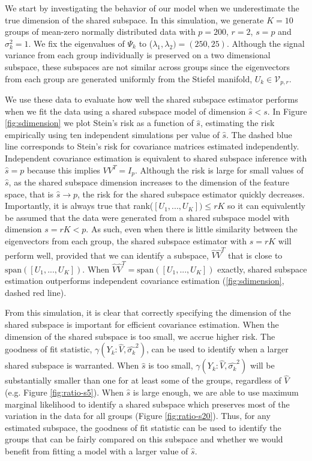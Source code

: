 \documentclass[12pt]{article}
\begin{document}
We start by investigating the behavior of our model when we
underestimate the true dimension of the shared subspace.  In this
simulation, we generate $K=10$ groups of mean-zero normally
distributed data with $p=200$, $r=2$, $s=p$ and $\sigma_k^2=1$.  We
fix the eigenvalues of $\Psi_k$ to
($\lambda_1, \lambda_2) = (250, 25)$.  Although the signal variance
from each group individually is preserved on a two dimensional
subspace, these subspaces are not similar across groups since the
eigenvectors from each group are generated uniformly from the Stiefel
manifold, $U_k \in \mathcal{V}_{p, r}$.

We use these data to evaluate how well the shared subspace estimator
performs when we fit the data using a shared subspace model of
dimension $\hat{s} < s$.  In Figure \ref{fig:sdimension} we plot
Stein's risk as a function of $\hat{s}$, estimating the risk
empirically using ten independent simulations per value of $\hat{s}$.
The dashed blue line corresponds to Stein's risk for covariance
matrices estimated independently.  Independent covariance estimation
is equivalent to shared subspace inference with $\hat{s} = p$ because
this implies $VV^T = I_p$.  Although the risk is large for small
values of $\hat{s}$, as the shared subspace dimension increases to the
dimension of the feature space, that is $\hat{s} \rightarrow p$, the
risk for the shared subspace estimator quickly decreases.
Importantly, it is always true that rank($[U_1, ..., U_K]) \leq rK$ so
it can equivalently be assumed that the data were generated from a
shared subspace model with dimension $s = rK < p$.  As such, even when
there is little similarity between the eigenvectors from each group,
the shared subspace estimator with $\hat{s} = rK$ will perform well,
provided that we can identify a subspace, $\hat{V}\hat{V}^T$ that is
close to $\text{span}([U_1, ..., U_K])$. When
$\hat{V}\hat{V}^T = \text{span}([U_1, ..., U_K])$ exactly, shared
subspace estimation outperforms independent covariance estimation
(\ref{fig:sdimension}, dashed red line).

From this simulation, it is clear that correctly specifying the
dimension of the shared subspace is important for efficient covariance
estimation.  When the dimension of the shared subspace is too small,
we accrue higher risk.  The goodness of fit statistic,
$\gamma(Y_k: \hat{V}, \hat{\sigma_k}^2)$, can be used to identify when
a larger shared subspace is warranted.  When $\hat{s}$ is too small,
$\gamma(Y_k: \hat{V}, \hat{\sigma_k}^2)$ will be substantially smaller
than one for at least some of the groups, regardless of $\hat{V}$
(e.g. Figure \ref{fig:ratio-s5}).  When $\hat{s}$ is large enough, we
are able to use maximum marginal likelihood to identify a shared
subspace which preserves most of the variation in the data for all
groups (Figure \ref{fig:ratio-s20}).  Thus, for any estimated
subspace, the goodness of fit statistic can be used to identify the
groups that can be fairly compared on this subspace and whether we
would benefit from fitting a model with a larger value of $\hat{s}$.
\end{document}
